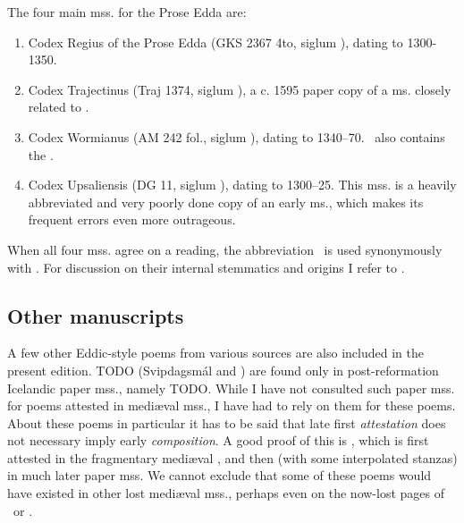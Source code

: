 The four main mss. for the Prose Edda are:%

\begin{enumerate}
  \item Codex Regius of the Prose Edda (GKS 2367 4to, siglum \RegiusProse), dating to 1300-1350.
  \item Codex Trajectinus (Traj 1374, siglum \Trajectinus), a c. 1595 paper copy of a ms. closely related to \RegiusProse.
  \item Codex Wormianus (AM 242 fol., siglum \Wormianus), dating to 1340–70. \Wormianus\ also contains the \Rigsthula.
  \item Codex Upsaliensis (DG 11, siglum \Upsaliensis), dating to 1300–25.  This mss. is a heavily abbreviated and very poorly done copy of an early ms., which makes its frequent errors even more outrageous.
\end{enumerate}

When all four mss. agree on a reading, the abbreviation \GylfMS\ is used synonymously with \RegiusProse\Trajectinus\Wormianus\Upsaliensis.  For discussion on their internal stemmatics and origins I refer to \textcite{Haukur2017}.

\subsection{Other manuscripts}

A few other Eddic-style poems from various sources are also included in the present edition.  TODO (Svipdagsmál and \Grougaldr) are found only in post-reformation Icelandic paper mss., namely TODO.  While I have not consulted such paper mss. for poems attested in mediæval mss., I have had to rely on them for these poems.  About these poems in particular it has to be said that late first \emph{attestation} does not necessary imply early \emph{composition}.  A good proof of this is \Baldrsdraumar, which is first attested in the fragmentary mediæval \AM, and then (with some interpolated stanzas) in much later paper mss.  We cannot exclude that some of these poems would have existed in other lost mediæval mss., perhaps even on the now-lost pages of \Regius\ or \AM.
